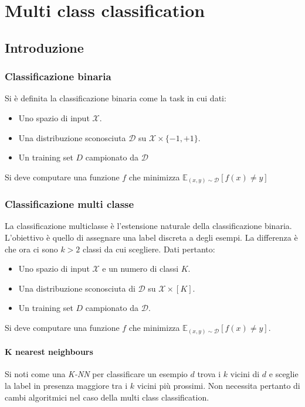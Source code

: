 \chapter{Multi class classification}

\section{Introduzione}

	\subsection{Classificazione binaria}
	Si \`e definita la classificazione binaria come la task in cui dati:
	\begin{multicols}{2}
		\begin{itemize}
			\item Uno spazio di input $\mathcal{X}$.
			\item Una distribuzione sconosciuta $\mathcal{D}$ su $\mathcal{X}\times\{-1,+1\}$.
			\item Un training set $D$ campionato da $\mathcal{D}$
		\end{itemize}
	\end{multicols}
	Si deve computare una funzione $f$ che minimizza $\mathbb{E}_{(x,y)\sim\mathcal{D}}[f(x)\neq y]$

	\subsection{Classificazione multi classe}
	La classificazione multiclasse \`e l'estensione naturale della classificazione binaria.
	L'obiettivo \`e quello di assegnare una label discreta a degli esempi.
	La differenza \`e che ora ci sono $k>2$ classi da cui scegliere.
	Dati pertanto:
	\begin{multicols}{2}
		\begin{itemize}
			\item Uno spazio di input $\mathcal{X}$ e un numero di classi $K$.
			\item Una distribuzione sconosciuta di $\mathcal{D}$ su $\mathcal{X}\times[K]$.
			\item Un training set $D$ campionato da $\mathcal{D}$.
		\end{itemize}
	\end{multicols}
	Si deve computare una funzione $f$ che minimizza $\mathbb{E}_{(x,y)\sim\mathcal{D}}[f(x)\neq y]$.

		\subsubsection{K nearest neighbours}
		Si noti come una \emph{K-NN} per classificare un esempio $d$ trova i $k$ vicini di $d$ e sceglie la label in presenza maggiore tra i $k$ vicini pi\`u prossimi.
		Non necessita pertanto di cambi algoritmici nel caso della multi class classification.

